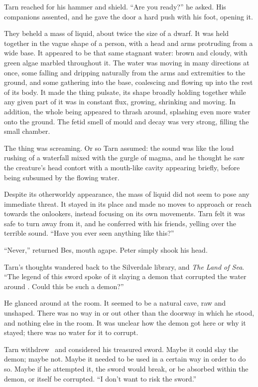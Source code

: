 Tarn reached for his hammer and shield.  ``Are you ready?'' he asked.  His companions assented, and he gave the door a hard push with his foot, opening it.

They beheld a mass of liquid, about twice the size of a dwarf.  It was held together in the vague shape of a person, with a head and arms protruding from a wide base.  It appeared to be that same stagnant water: brown and cloudy, with green algae marbled throughout it.  The water was moving in many directions at once, some falling and dripping naturally from the arms and extremities to the ground, and some gathering into the base, coalescing and flowing up into the rest of its body.  It made the thing pulsate, its shape broadly holding together while any given part of it was in constant flux, growing, shrinking and moving.  In addition, the whole being appeared to thrash around, splashing even more water onto the ground.  The fetid smell of mould and decay was very strong, filling the small chamber.

The thing was screaming.  Or so Tarn assumed: the sound was like the loud rushing of a waterfall mixed with the gurgle of magma, and he thought he saw the creature's head contort with a mouth-like cavity appearing briefly, before being subsumed by the flowing water.

Despite its otherworldy appearance, the mass of liquid did not seem to pose any immediate threat.  It stayed in its place and made no moves to approach or reach towards the onlookers, instead focusing on its own movements.  Tarn felt it was safe to turn away from it, and he conferred with his friends, yelling over the terrible sound.  ``Have you ever seen anything like this?''

``Never,'' returned Bes, mouth agape.  Peter simply shook his head.

Tarn's thoughts wandered back to the Silverdale library, and \emph{The Land of Sea}.  ``The legend of this sword spoke of it slaying a demon that corrupted the water around \atmudarant.  Could this be such a demon?''

He glanced around at the room.  It seemed to be a natural cave, raw and unshaped.  There was no way in or out other than the doorway in which he stood, and nothing else in the room.  It was unclear how the demon got here or why it stayed; there was no water for it to corrupt.

Tarn withdrew \kildir\ and considered his treasured sword.  Maybe it could slay the demon; maybe not.  Maybe it needed to be used in a certain way in order to do so.  Maybe if he attempted it, the sword would break, or be absorbed within the demon, or itself be corrupted. ``I don't want to risk the sword.''

